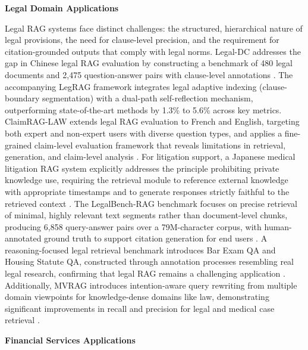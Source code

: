 \documentclass[11pt]{article}
\begin{document}
\textbf{Legal Domain Applications}

Legal RAG systems face distinct challenges: the structured, hierarchical nature of legal provisions, the need for clause-level precision, and the requirement for citation-grounded outputs that comply with legal norms. Legal-DC addresses the gap in Chinese legal RAG evaluation by constructing a benchmark of 480 legal documents and 2,475 question-answer pairs with clause-level annotations \cite{ref561}. The accompanying LegRAG framework integrates legal adaptive indexing (clause-boundary segmentation) with a dual-path self-reflection mechanism, outperforming state-of-the-art methods by 1.3\% to 5.6\% across key metrics. ClaimRAG-LAW extends legal RAG evaluation to French and English, targeting both expert and non-expert users with diverse question types, and applies a fine-grained claim-level evaluation framework that reveals limitations in retrieval, generation, and claim-level analysis \cite{ref395}. For litigation support, a Japanese medical litigation RAG system explicitly addresses the principle prohibiting private knowledge use, requiring the retrieval module to reference external knowledge with appropriate timestamps and to generate responses strictly faithful to the retrieved context \cite{ref562}. The LegalBench-RAG benchmark focuses on precise retrieval of minimal, highly relevant text segments rather than document-level chunks, producing 6,858 query-answer pairs over a 79M-character corpus, with human-annotated ground truth to support citation generation for end users \cite{ref563}. A reasoning-focused legal retrieval benchmark introduces Bar Exam QA and Housing Statute QA, constructed through annotation processes resembling real legal research, confirming that legal RAG remains a challenging application \cite{ref564}. Additionally, MVRAG introduces intention-aware query rewriting from multiple domain viewpoints for knowledge-dense domains like law, demonstrating significant improvements in recall and precision for legal and medical case retrieval \cite{ref396}.

\textbf{Financial Services Applications}
\end{document}
